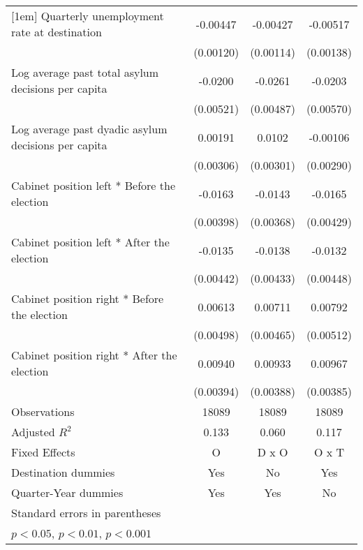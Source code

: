 \begin{table}[htbp]
\begin{tabular}{l*{3}{c}}
[1em]
Quarterly unemployment rate at destination&    -0.00447\sym{***}&    -0.00427\sym{***}&    -0.00517\sym{***}\\
                    &   (0.00120)         &   (0.00114)         &   (0.00138)         \\
[1em]
Log average past total asylum decisions per capita&     -0.0200\sym{***}&     -0.0261\sym{***}&     -0.0203\sym{***}\\
                    &   (0.00521)         &   (0.00487)         &   (0.00570)         \\
[1em]
Log average past dyadic asylum decisions per capita&     0.00191         &      0.0102\sym{**} &    -0.00106         \\
                    &   (0.00306)         &   (0.00301)         &   (0.00290)         \\
[1em]
Cabinet position left * Before the election&     -0.0163\sym{***}&     -0.0143\sym{***}&     -0.0165\sym{***}\\
                    &   (0.00398)         &   (0.00368)         &   (0.00429)         \\
[1em]
Cabinet position left * After the election&     -0.0135\sym{**} &     -0.0138\sym{**} &     -0.0132\sym{**} \\
                    &   (0.00442)         &   (0.00433)         &   (0.00448)         \\
[1em]
Cabinet position right * Before the election&     0.00613         &     0.00711         &     0.00792         \\
                    &   (0.00498)         &   (0.00465)         &   (0.00512)         \\
[1em]
Cabinet position right * After the election&     0.00940\sym{*}  &     0.00933\sym{*}  &     0.00967\sym{*}  \\
                    &   (0.00394)         &   (0.00388)         &   (0.00385)         \\
\hline
Observations        &       18089         &       18089         &       18089         \\
Adjusted \(R^{2}\)  &       0.133         &       0.060         &       0.117         \\
Fixed Effects       &           O         &       D x O         &       O x T         \\
Destination dummies &         Yes         &          No         &         Yes         \\
Quarter-Year dummies&         Yes         &         Yes         &          No         \\
\hline\hline
\multicolumn{4}{l}{\footnotesize Standard errors in parentheses}\\
\multicolumn{4}{l}{\footnotesize \sym{*} \(p<0.05\), \sym{**} \(p<0.01\), \sym{***} \(p<0.001\)}\\
\end{tabular}
\end{table}
